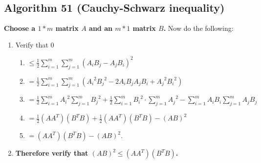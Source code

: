 \documentclass[twocolumn]{article}
\begin{document}
		\subsection{Algorithm 51 (Cauchy-Schwarz inequality)}\label{sec:algorithm 51}
			\textbf{Choose a $1*m$ matrix $A$ and an $m*1$ matrix $B$.} Now do the following:
			\begin{enumerate}
				\item Verify that $0$
				\begin{enumerate}
					\item $\le\frac{1}{2}\sum_{i=1}^m\sum_{j=1}^m (A_iB_j-A_jB_i)^2$
					\item $=\frac{1}{2}\sum_{i=1}^m\sum_{j=1}^m ({A_i}^2{B_j}^2-2A_iB_jA_jB_i+{A_j}^2{B_i}^2)$
					\item $=\frac{1}{2}\sum_{i=1}^m {A_i}^2\sum_{j=1}^m {B_j}^2+\frac{1}{2}\sum_{i=1}^m {B_i}^2\cdot\allowbreak\sum_{j=1}^m {A_j}^2-\sum_{i=1}^m A_iB_i\sum_{j=1}^m A_jB_j$
					\item $=\frac{1}{2}(AA^T)(B^TB)+\frac{1}{2}(AA^T)(B^TB)-(AB)^2$
					\item $=(AA^T)(B^TB)-(AB)^2$.
				\end{enumerate}
				\item \textbf{Therefore verify that $(AB)^2\le(AA^T)(B^TB)$.}
			\end{enumerate}
\end{document}
